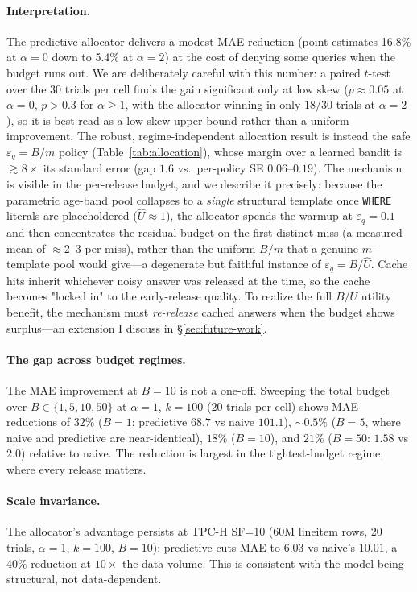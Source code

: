 \documentclass[sigconf,nonacm]{acmart}
\newcommand{\eps}{\varepsilon}
\begin{document}
\paragraph{Interpretation.}
The predictive allocator delivers a modest MAE reduction (point estimates 16.8\% at $\alpha=0$ down to 5.4\% at $\alpha=2$) at the cost of denying some queries when the budget runs out. We are deliberately careful with this number: a paired $t$-test over the $30$ trials per cell finds the gain significant only at low skew ($p\approx0.05$ at $\alpha=0$, $p>0.3$ for $\alpha\ge1$, with the allocator winning in only $18/30$ trials at $\alpha=2$), so it is best read as a low-skew upper bound rather than a uniform improvement. The robust, regime-independent allocation result is instead the safe $\eps_q=B/m$ policy (Table~\ref{tab:allocation}), whose margin over a learned bandit is $\gtrsim 8\times$ its standard error (gap $1.6$ vs.\ per-policy SE $0.06$--$0.19$). The mechanism is visible in the per-release budget, and we describe it precisely: because the parametric age-band pool collapses to a \emph{single} structural template once \texttt{WHERE} literals are placeholdered ($\hat U\approx1$), the allocator spends the warmup at $\eps_q=0.1$ and then concentrates the residual budget on the first distinct miss (a measured mean of ${\approx}2$--$3$ per miss), rather than the uniform $B/m$ that a genuine $m$-template pool would give---a degenerate but faithful instance of $\eps_q=B/\hat U$. Cache hits inherit whichever noisy answer was released at the time, so the cache becomes "locked in" to the early-release quality. To realize the full $B/U$ utility benefit, the mechanism must \emph{re-release} cached answers when the budget shows surplus---an extension I discuss in §\ref{sec:future-work}.

\paragraph{The gap across budget regimes.}
The MAE improvement at $B=10$ is not a one-off. Sweeping the total budget over $B\in\{1,5,10,50\}$ at $\alpha=1$, $k=100$ ($20$ trials per cell) shows MAE reductions of $32\%$ ($B{=}1$: predictive $68.7$ vs naive $101.1$), $\sim$$0.5\%$ ($B{=}5$, where naive and predictive are near-identical), $18\%$ ($B{=}10$), and $21\%$ ($B{=}50$: $1.58$ vs $2.0$) relative to naive. The reduction is largest in the tightest-budget regime, where every release matters.

\paragraph{Scale invariance.}
The allocator's advantage persists at TPC-H SF=10 (60M lineitem rows, 20 trials, $\alpha=1$, $k=100$, $B=10$): predictive cuts MAE to $6.03$ vs naive's $10.01$, a $40\%$ reduction at $10\times$ the data volume. This is consistent with the model being structural, not data-dependent.
\end{document}
